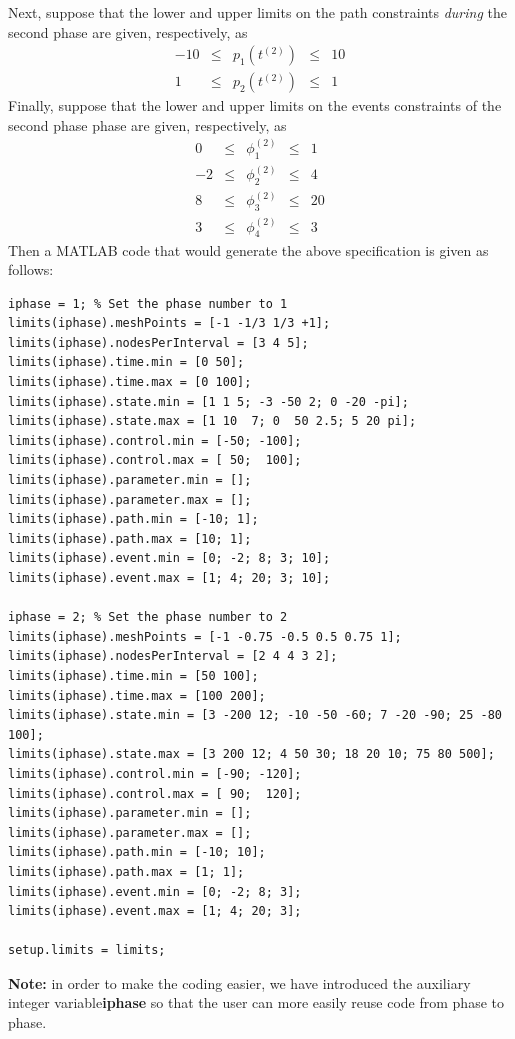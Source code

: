 \documentclass[10pt]{article}
\newenvironment{shadedframe}{%
  \def\FrameCommand{\fcolorbox{black}{shadecolor}}%
  \MakeFramed {\FrameRestore}}
{\endMakeFramed}
\begin{document}
\begin{shadedframe}
Next, suppose that the lower and upper limits on the path constraints
{\em during} the second phase are given, respectively, as
\begin{displaymath}
 \begin{array}{rcccr}
   -10 & \leq & p_1(t^{(2)}) & \leq & 10 \\
    1 & \leq & p_2(t^{(2)})& \leq & 1
 \end{array}
\end{displaymath}
Finally, suppose that the lower and upper limits on the events
constraints of the second phase phase are given, respectively, as
\begin{displaymath}
 \begin{array}{rcccr}
   0 & \leq & \phi_1^{(2)}  & \leq & 1 \\
    -2 & \leq & \phi_2^{(2)} & \leq & 4 \\
   8 & \leq & \phi_3^{(2)} & \leq & 20 \\
   3 & \leq & \phi_4^{(2)} & \leq & 3
 \end{array}
\end{displaymath}
Then a MATLAB code that would generate the above specification is
given as follows:
\begin{verbatim}
iphase = 1; % Set the phase number to 1
limits(iphase).meshPoints = [-1 -1/3 1/3 +1]; 
limits(iphase).nodesPerInterval = [3 4 5]; 
limits(iphase).time.min = [0 50];
limits(iphase).time.max = [0 100];
limits(iphase).state.min = [1 1 5; -3 -50 2; 0 -20 -pi];
limits(iphase).state.max = [1 10  7; 0  50 2.5; 5 20 pi];
limits(iphase).control.min = [-50; -100];
limits(iphase).control.max = [ 50;  100];
limits(iphase).parameter.min = [];
limits(iphase).parameter.max = [];
limits(iphase).path.min = [-10; 1];
limits(iphase).path.max = [10; 1];
limits(iphase).event.min = [0; -2; 8; 3; 10];
limits(iphase).event.max = [1; 4; 20; 3; 10];

iphase = 2; % Set the phase number to 2
limits(iphase).meshPoints = [-1 -0.75 -0.5 0.5 0.75 1];
limits(iphase).nodesPerInterval = [2 4 4 3 2];
limits(iphase).time.min = [50 100];
limits(iphase).time.max = [100 200];
limits(iphase).state.min = [3 -200 12; -10 -50 -60; 7 -20 -90; 25 -80 100];
limits(iphase).state.max = [3 200 12; 4 50 30; 18 20 10; 75 80 500];
limits(iphase).control.min = [-90; -120];
limits(iphase).control.max = [ 90;  120];
limits(iphase).parameter.min = [];
limits(iphase).parameter.max = [];
limits(iphase).path.min = [-10; 10];
limits(iphase).path.max = [1; 1];
limits(iphase).event.min = [0; -2; 8; 3];
limits(iphase).event.max = [1; 4; 20; 3];

setup.limits = limits;
\end{verbatim}
\end{shadedframe}
\normalsize
{\noindent}{\bf Note:}  in order to make the coding easier, we have
introduced the auxiliary integer variable{\bf iphase} so that the user
can more easily reuse code from phase to phase.
\end{document}
